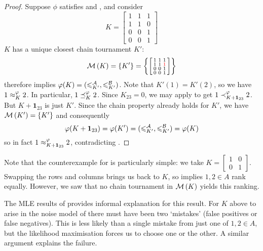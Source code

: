 \begin{proof}
     Suppose $\phi$ satisfies  and
    , and consider
    \[
        K = \left[\begin{smallmatrix}
            1 & 1 & 1 \\
            1 & 1 & 0 \\
            0 & 0 & 1 \\
            0 & 0 & 1
        \end{smallmatrix}\right]
    \]
    $K$ has a unique closest chain tournament $K'$:
    \[
        \operatorname{\mathcal{M}}\left({K}\right) = \{K'\} = \left\{
            \left[\begin{smallmatrix}
            1 & 1 & 1 \\
            1 & 1 & \color{red}{1} \\
            0 & 0 & 1 \\
            0 & 0 & 1
        \end{smallmatrix}\right]
        \right\}
    \]
     therefore implies $\varphi(K) = ({\leqslant^{\mathcal{A}}_{K'}},
    {\leqslant^{\mathcal{B}}_{K'}})$.  Note that $K'(1) = K'(2)$, so we have $1 \approx_K^\varphi 2$.
    In particular, $1 \preceq_K^\varphi 2$. Since $K_{23} = 0$, we may apply
     to get $1 \prec_{K + \bm{1}_{23}}^\varphi 2$.  But $K +
    \bm{1}_{23}$ is just $K'$. Since the chain property already holds for
    $K'$, we have $\operatorname{\mathcal{M}}\left({K'}\right) = \{K'\}$ and consequently
    \[
        \varphi(K + \bm{1}_{23})
        = \varphi(K')
        = ({\leqslant^{\mathcal{A}}_{K'}}, {\leqslant^{\mathcal{B}}_{K'}})
        = \varphi(K)
    \]
    so in fact $1 \approx_{K + \bm{1}_{23}}^\varphi 2$, contradicting
    .
\end{proof}

Note that the counterexample for  is particularly simple: we
take $K = \left[\begin{smallmatrix} 1&0\\0&1 \end{smallmatrix}\right]$.
Swapping the rows and columns brings us back to $K$, so  implies
$1, 2 \in A$ rank equally. However, we saw that no chain tournament in
$\operatorname{\mathcal{M}}\left({K}\right)$ yields this ranking.

The MLE results of  provides informal
explanation for this result. For $K$ above to arise in the noise model of
 there must have been two `mistakes' (false positives or
false negatives). This is less likely than a single mistake from just one of
$1,2 \in A$, but the likelihood maximisation forces us to choose one or the
other. A similar argument explains the  failure.

